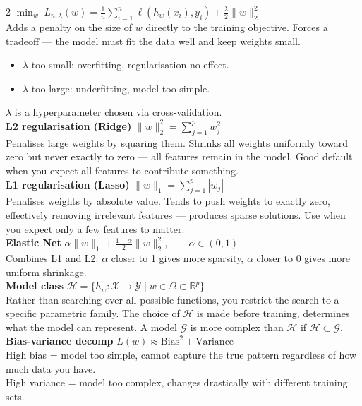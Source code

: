\documentclass[10pt]{article}
\begin{document}
\begin{multicols*}{2}
$\min_{w} \; L_{n,\lambda}(w) = \frac{1}{n} \sum_{i=1}^{n} \ell(h_w(x_i), y_i) + \frac{\lambda}{2} \|w\|_2^2$\\
Adds a penalty on the size of $w$ directly to the training objective.
Forces a tradeoff — the model must fit the data well and keep weights small.\\
\begin{itemize}
    \item $\lambda$ too small: overfitting, regularisation no effect.
    \item $\lambda$ too large: underfitting, model too simple.
\end{itemize}
$\lambda$ is a hyperparameter chosen via cross-validation.\\
\textbf{L2 regularisation (Ridge)}
$\|w\|_2^2 = \sum_{j=1}^{p} w_j^2$\\
Penalises large weights by squaring them. Shrinks all weights uniformly toward zero but never exactly to zero — all features remain in the model.
Good default when you expect all features to contribute something.\\
\textbf{L1 regularisation (Lasso)}
$\|w\|_1 = \sum_{j=1}^{p} |w_j|$\\
Penalises weights by absolute value. Tends to push weights to exactly zero, effectively removing irrelevant features — produces sparse solutions.
Use when you expect only a few features to matter.\\
\textbf{Elastic Net}
$\alpha \|w\|_1 + \frac{1-\alpha}{2} \|w\|_2^2, \qquad \alpha \in (0,1)$\\
Combines L1 and L2. $\alpha$ closer to 1 gives more sparsity, $\alpha$ closer to 0 gives more uniform shrinkage.\\
\vspace{1em}
\textbf{Model class}
$\mathcal{H} = \{h_w : \mathcal{X} \to \mathcal{Y} \mid w \in \Omega \subset \mathbb{R}^p\}$\\
Rather than searching over all possible functions, you restrict the search to a specific parametric family.
The choice of $\mathcal{H}$ is made before training, determines what the model can represent.
A model $\mathcal{G}$ is more complex than $\mathcal{H}$ if $\mathcal{H}\subset \mathcal{G}$.\\
\textbf{Bias-variance decomp}
$L(w) \approx \text{Bias}^2 + \text{Variance}$\\
High bias = model too simple, cannot capture the true pattern regardless of how much data you have.\\
High variance = model too complex, changes drastically with different training sets.\\

\end{multicols*}
\end{document}

